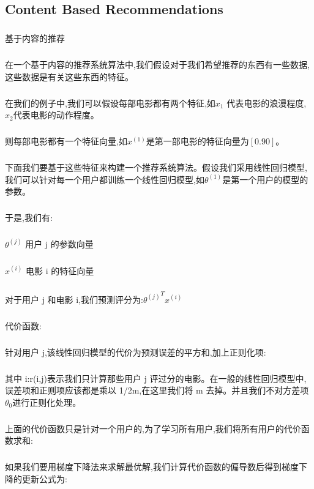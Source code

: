 \documentclass{article}
\begin{document}
\begin{CJK}{UTF8}{gbsn}
\subsection{Content Based Recommendations}
\subparagraph{}
基于内容的推荐
\subparagraph{}
在一个基于内容的推荐系统算法中,我们假设对于我们希望推荐的东西有一些数据,这些数据是有关这些东西的特征。
\subparagraph{}
在我们的例子中,我们可以假设每部电影都有两个特征,如$x_1$ 代表电影的浪漫程度,$x_2$代表电影的动作程度。
\subparagraph{}
则每部电影都有一个特征向量,如$x^{(1)}$是第一部电影的特征向量为$[0.9 0]$。
\subparagraph{}
下面我们要基于这些特征来构建一个推荐系统算法。假设我们采用线性回归模型,我们可以针对每一个用户都训练一个线性回归模型,如$\theta^{(1)}$是第一个用户的模型的参数。
\begin{figure}[H]
\label{fig:993}
\end{figure}
\subparagraph{} 
于是,我们有:
\begin{figure}[H]
\label{fig:995}
\end{figure}
\subparagraph{}
$\theta^{(j)}$ 用户 j 的参数向量
\subparagraph{}
$x^{(i)}$ 电影 i 的特征向量
\subparagraph{}
对于用户 j 和电影 i,我们预测评分为:${\theta^{(j)}}^Tx^{(i)}$
\subparagraph{}
代价函数:
\subparagraph{}
针对用户 j,该线性回归模型的代价为预测误差的平方和,加上正则化项:
\begin{figure}[H]
\label{fig:991}
\end{figure}
\subparagraph{}
其中 i:r(i,j)表示我们只计算那些用户 j 评过分的电影。在一般的线性回归模型中,误差项和正则项应该都是乘以 1/2m,在这里我们将 m 去掉。并且我们不对方差项 $\theta_0$进行正则化处理。
\subparagraph{}
上面的代价函数只是针对一个用户的,为了学习所有用户,我们将所有用户的代价函数求和:
\begin{figure}[H]
\label{fig:992}
\end{figure}
\begin{figure}[H]
\label{fig:996}
\end{figure}
\subparagraph{}
如果我们要用梯度下降法来求解最优解,我们计算代价函数的偏导数后得到梯度下降的更新公式为:
\begin{figure}[H]
\label{fig:998}
\end{figure}
\begin{figure}[H]
\label{fig:994}
\end{figure}
\begin{figure}[H]
\label{fig:997}
\end{figure}

\end{CJK}
\end{document}

